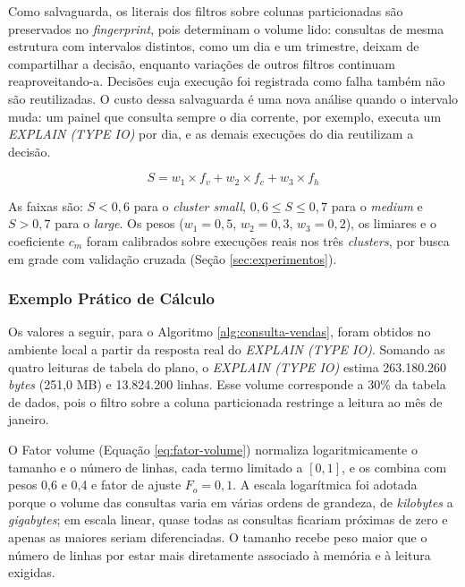 Como salvaguarda, os literais dos filtros sobre colunas particionadas são preservados no \textit{fingerprint}, pois determinam o volume lido: consultas de mesma estrutura com intervalos distintos, como um dia e um trimestre, deixam de compartilhar a decisão, enquanto variações de outros filtros continuam reaproveitando-a. Decisões cuja execução foi registrada como falha também não são reutilizadas. O custo dessa salvaguarda é uma nova análise quando o intervalo muda: um painel que consulta sempre o dia corrente, por exemplo, executa um \textit{EXPLAIN (TYPE IO)} por dia, e as demais execuções do dia reutilizam a decisão.

\begin{equation}
\label{eq:pontuacao}
S = w_1 \times f_v + w_2 \times f_c + w_3 \times f_h
\end{equation}

As faixas são: $S < 0,6$ para o \textit{cluster small}, $0,6 \leq S \leq 0,7$ para o \textit{medium} e $S > 0,7$ para o \textit{large}. Os pesos ($w_1 = 0,5$, $w_2 = 0,3$, $w_3 = 0,2$), os limiares e o coeficiente $c_m$ foram calibrados sobre execuções reais nos três \textit{clusters}, por busca em grade com validação cruzada (Seção \ref{sec:experimentos}).

\subsubsection{Exemplo Prático de Cálculo}

Os valores a seguir, para o Algoritmo \ref{alg:consulta-vendas}, foram obtidos no ambiente local a partir da resposta real do \textit{EXPLAIN (TYPE IO)}. Somando as quatro leituras de tabela do plano, o \textit{EXPLAIN (TYPE IO)} estima 263.180.260 \textit{bytes} (251,0 MB) e 13.824.200 linhas. Esse volume corresponde a 30\% da tabela de dados, pois o filtro sobre a coluna particionada restringe a leitura ao mês de janeiro.

O Fator volume (Equação \ref{eq:fator-volume}) normaliza logaritmicamente o tamanho e o número de linhas, cada termo limitado a $[0,1]$, e os combina com pesos 0,6 e 0,4 e fator de ajuste $F_o = 0,1$. A escala logarítmica foi adotada porque o volume das consultas varia em várias ordens de grandeza, de \textit{kilobytes} a \textit{gigabytes}; em escala linear, quase todas as consultas ficariam próximas de zero e apenas as maiores seriam diferenciadas. O tamanho recebe peso maior que o número de linhas por estar mais diretamente associado à memória e à leitura exigidas.

